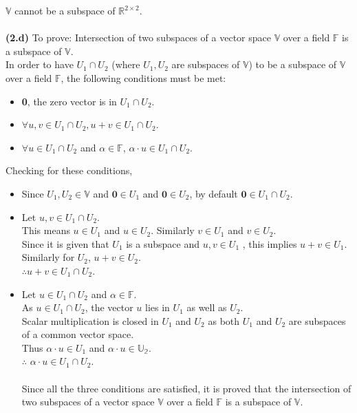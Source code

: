 \documentclass[12pt,letterpaper,fleqn]{article}
\theoremstyle{definition}
\begin{document}
	$\mathbb{V}$ cannot be a subspace of $\mathbb{R}^{2 \times 2}$.\\
	\\
 \textbf{(2.d)} To prove: Intersection of two subspaces of a vector space $\mathbb{V}$ over a field $\mathbb{F}$ is a subspace of $\mathbb{V}$.\\
 In order to have $U_1 \cap U_2$ (where $U_1, U_2$ are subspaces of $\mathbb{V}$) to be a subspace of $\mathbb{V}$ over a field $\mathbb{F}$, the following conditions must be met:\\
 \begin{itemize}
 \item \textbf{0}, the zero vector is in $U_1 \cap U_2$.
 \item $\forall u,v \in U_1 \cap U_2, u + v \in U_1 \cap U_2$.
 \item $\forall u \in U_1 \cap U_2$ and $\alpha \in \mathbb{F}$, $\alpha \cdot u \in U_1 \cap U_2$.
\end{itemize}  
Checking for these conditions,
\begin{itemize}
\item Since $U_1, U_2 \in \mathbb{V}$ and $\textbf{0} \in U_1$ and $\textbf{0} \in U_2$, by default $\textbf{0} \in U_1 \cap U_2$.
\item Let $u,v \in U_1 \cap U_2$.\\
This means $u \in U_1$ and $u \in U_2$. Similarly $v \in U_1$ and $v \in U_2$.\\
Since it is given that $U_1$ is a subspace and $u,v \in U_1$ , this implies $u + v \in U_1$.\\
Similarly for $U_2$, $ u + v \in U_2$.\\
$\therefore u + v \in U_1 \cap U_2$.
\item Let $u \in U_1 \cap U_2$ and $\alpha \in \mathbb{F}$.\\
As $u \in U_1 \cap U_2$, the vector $u$ lies in $U_1$ as well as $U_2$.\\
Scalar multiplication is closed in $U_1$ and $U_2$ as both $U_1$ and $U_2$ are subspaces of a common vector space.\\
Thus $\alpha \cdot u \in U_1$ and $\alpha \cdot u \in \mathbb{U_2}$.\\
$\therefore$ $\alpha \cdot u \in U_1 \cap U_2$.
\\
\\
Since all the three conditions are satisfied, it is proved that the intersection of two subspaces of a vector space $\mathbb{V}$ over a field $\mathbb{F}$ is a subspace of $\mathbb{V}$.
\end{itemize}
\end{document}
